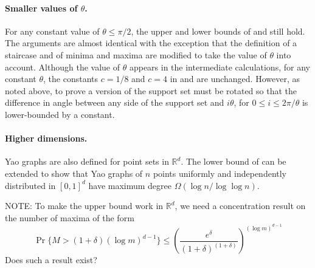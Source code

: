 \documentclass[lotsofwhite,charterfonts]{patmorin}
\newcommand{\RR}{\mathbb{R}}
\begin{document}
\paragraph{Smaller values of $\theta$.}
For any constant value of $\theta \le \pi /2$, the upper and lower bounds
of  and 
still hold.  The arguments are almost identical with the exception that
the definition of a staircase and of minima and maxima are modified to
take the value of $\theta$ into account.  Although the value of $\theta$
appears in the intermediate calculations, for any constant $\theta$,
the constants $c=1/8$ and $c=4$ in 
and  are unchanged.  However, as noted above,
to prove a version of  the support set
must be rotated so that the difference in angle between any side of the
support set and $i\theta$, for $0\le i\le 2\pi/\theta$ is lower-bounded
by a constant.


\paragraph{Higher dimensions.}  
Yao graphs are also defined for point sets in $\RR^d$.  The lower bound of
 can be extended to show that Yao graphs
of $n$ points uniformly and independently distributed in $[0,1]^d$ have
maximum degree $\Omega(\log n/\log\log n)$.  

NOTE: To make the upper bound work in $\RR^d$, we need a concentration
result on the number of maxima of the form
\[
\Pr\{M > (1+\delta)(\log m)^{d-1}\} \le
   \left(\frac{e^\delta}{(1+\delta)^{(1+\delta)}}\right)^{(\log m)^{d-1}}
\]
Does such a result exist?




\nocite{*}

\end{document}
